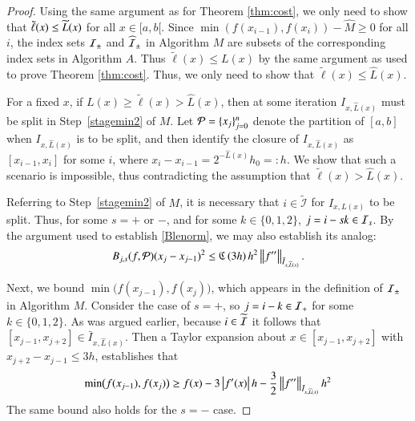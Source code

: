 \documentclass[review]{elsarticle}
\theoremstyle{definition}
\newcommand{\tell}{\tilde{\ell}}
\newcommand{\chL}{\widehat{L}}
\newcommand{\minfii}{\min(f(x_{i-1}), f(x_i))} %
\begin{document}
\begin{proof}
Using the same argument as for Theorem \ref{thm:cost}, we only need to show that
$\tell(x) \le \tL(x)$ for all $x \in [a,b[$. Since $\minfii - \widehat{M} \ge 0$
for all $i$, the index sets $\mathcal{I}_{\pm}$ and $\widehat{\mathcal{I}}_{\pm}$ in Algorithm
$M$ are subsets of the corresponding index sets in Algorithm $A$. Thus $\tell(x)
\le L(x)$ by the same argument as used to prove Theorem \ref{thm:cost}. Thus, we
only need to show that $\tell(x) \le \chL(x)$.
	
For a fixed $x$, if $L(x) \ge \tell(x) > \chL(x)$, then at some iteration
$I_{x,\chL(x)}$ must be split in Step~\ref{stagemin2} of $M$. Let $\mathcal{P} =
\{x_j\}_{j=0}^n$ denote the partition of $[a,b]$ when $I_{x,\chL(x)}$ is to be
split, and then identify the closure of $I_{x,\chL(x)}$ as $[x_{i-1},x_i]$ for
some $i$, where $x_i-x_{i-1}=2^{-\chL(x)}h_0 =: h$. We show that such a scenario
is impossible, thus contradicting the assumption that $\tell(x) > \chL(x)$.

Referring to Step~\ref{stagemin2} of $M$, it is necessary that $i \in
\widetilde{\mathcal{I}}$ for $I_{x,L(x)}$ to be split. Thus, for some $s =+$ or
$-$, and for some $k \in \{0,1,2\}$, $j = i - sk \in \mathcal{I}_s$. By the argument
used to establish \eqref{Blenorm}, we may also establish its analog:
\begin{equation} \label{Blenormt}
B_{j,s}(f,\cp)(x_j-x_{j-1})^2 \le  \fC\left(3h\right) h^2  \norm[\bar{I}_{x,\chL(x)}]{f''}.
\end{equation}

Next, we bound $\min\bigl(f(x_{j-1}),f(x_j) \bigr)$, which appears in the
definition of $\mathcal{I}_{\pm}$ in Algorithm $M$. Consider the case of $s=+$, so $j =
i - k \in \mathcal{I}_+$ for some $k \in \{0,1,2\}$. As was argued earlier, because $i
\in \widetilde{\mathcal{I}}$ it follows that $[x_{j-1},x_{j+2}] \in
\bar{I}_{x,\chL(x)}$. Then a Taylor expansion about $x \in [x_{j-1},x_{j+2}]$
with $x_{j+2} - x_{j-1} \le 3h$, establishes that
\begin{equation} \label{minfjjm1bd}
\min\bigl(f(x_{j-1}),f(x_j) \bigr)
\ge f(x) - 3\abs{f'(x)}h - \frac32  \norm[\bar{I}_{x,\chL(x)}]{f''} h^2
\end{equation}
The same bound also holds for the $s = -$ case.


\end{proof}
\end{document}
